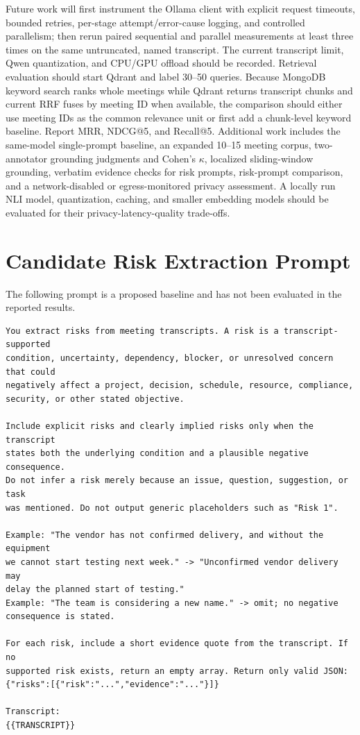 \documentclass[conference]{IEEEtran}
\begin{document}
Future work will first instrument the Ollama client with explicit request timeouts, bounded retries, per-stage attempt/error-cause logging, and controlled parallelism; then rerun paired sequential and parallel measurements at least three times on the same untruncated, named transcript. The current transcript limit, Qwen quantization, and CPU/GPU offload should be recorded. Retrieval evaluation should start Qdrant and label 30--50 queries. Because MongoDB keyword search ranks whole meetings while Qdrant returns transcript chunks and current RRF fuses by meeting ID when available, the comparison should either use meeting IDs as the common relevance unit or first add a chunk-level keyword baseline. Report MRR, NDCG@5, and Recall@5. Additional work includes the same-model single-prompt baseline, an expanded 10--15 meeting corpus, two-annotator grounding judgments and Cohen's $\kappa$, localized sliding-window grounding, verbatim evidence checks for risk prompts, risk-prompt comparison, and a network-disabled or egress-monitored privacy assessment. A locally run NLI model, quantization, caching, and smaller embedding models should be evaluated for their privacy-latency-quality trade-offs.

\appendices
\section{Candidate Risk Extraction Prompt}
The following prompt is a proposed baseline and has not been evaluated in the reported results.
\begin{lstlisting}[basicstyle=\ttfamily\scriptsize,breaklines=true,breakatwhitespace=true,columns=fullflexible]
You extract risks from meeting transcripts. A risk is a transcript-supported
condition, uncertainty, dependency, blocker, or unresolved concern that could
negatively affect a project, decision, schedule, resource, compliance,
security, or other stated objective.

Include explicit risks and clearly implied risks only when the transcript
states both the underlying condition and a plausible negative consequence.
Do not infer a risk merely because an issue, question, suggestion, or task
was mentioned. Do not output generic placeholders such as "Risk 1".

Example: "The vendor has not confirmed delivery, and without the equipment
we cannot start testing next week." -> "Unconfirmed vendor delivery may
delay the planned start of testing."
Example: "The team is considering a new name." -> omit; no negative
consequence is stated.

For each risk, include a short evidence quote from the transcript. If no
supported risk exists, return an empty array. Return only valid JSON:
{"risks":[{"risk":"...","evidence":"..."}]}

Transcript:
{{TRANSCRIPT}}
\end{lstlisting}
\end{document}
